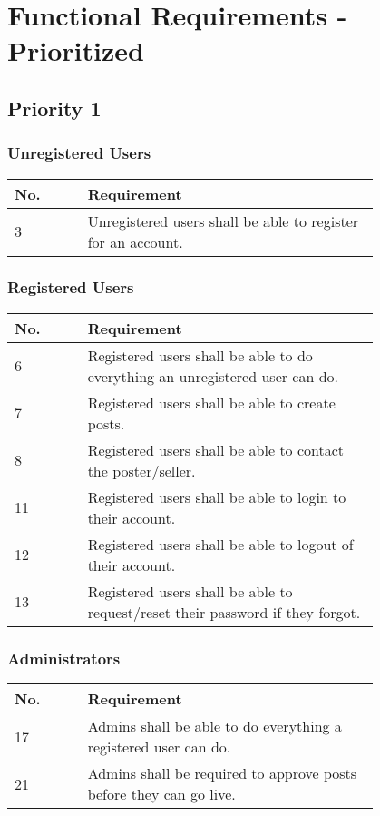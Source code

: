 \section{Functional Requirements - Prioritized}

\subsection{Priority 1}
\subsubsection{Unregistered Users}
\begin{tabular}{ | l | p{0.8\linewidth} | }
\hline
No. & Requirement\\\hline
3 & Unregistered users shall be able to register for an account.\\\hline
\end{tabular}

\subsubsection{Registered Users}
\begin{tabular}{ | l | p{0.8\linewidth} | }
\hline
No. & Requirement\\\hline
6 & Registered users shall be able to do everything an unregistered user can do.\\\hline
7 & Registered users shall be able to create posts.\\\hline
8 & Registered users shall be able to contact the poster/seller. \\\hline
11 & Registered users shall be able to login to their account.\\\hline
12 & Registered users shall be able to logout of their account.\\\hline
13 & Registered users shall be able to request/reset their password if they forgot.\\\hline
\end{tabular}

\subsubsection{Administrators}
\begin{tabular}{ | l | p{0.8\linewidth} | }
\hline
No. & Requirement\\\hline
17 & Admins shall be able to do everything a registered user can do.\\\hline
21 & Admins shall be required to approve posts before they can go live.\\\hline
\end{tabular}


